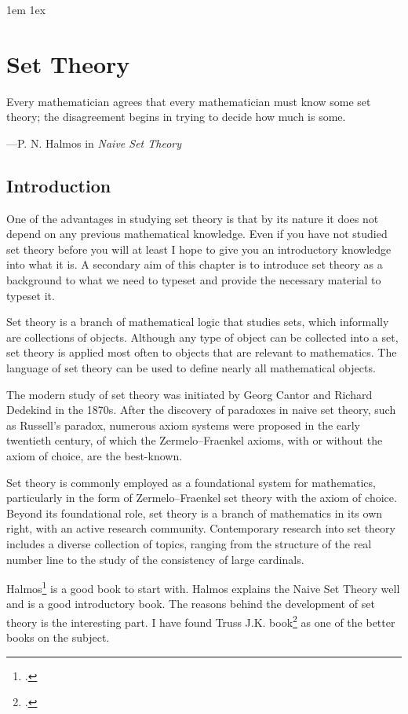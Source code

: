 \large
\parindent1em
\parskip1ex
\chapter{Set Theory}
\epigraph{Every mathematician agrees that every mathematician must know some 
set theory; the disagreement begins in trying to decide how much is some. }{---P. N. Halmos in \textit{Naive Set Theory}}

\section{Introduction}

One of the advantages in studying set theory is that by its nature it does not depend on any previous mathematical knowledge. Even if you have not studied set theory before you will at least I hope to give you an introductory knowledge into what it is. A secondary  aim of this chapter is to introduce set theory as a background to what we need to typeset and provide the necessary material to typeset it.

Set theory is a branch of mathematical logic that studies sets, which informally are collections of objects. Although any type of object can be collected into a set, set theory is applied most often to objects that are relevant to mathematics. The language of set theory can be used to define nearly all mathematical objects.

The modern study of set theory was initiated by Georg Cantor and Richard Dedekind in the 1870s. After the discovery of paradoxes in naive set theory, such as Russell's paradox, numerous axiom systems were proposed in the early twentieth century, of which the Zermelo–Fraenkel axioms, with or without the axiom of choice, are the best-known.

Set theory is commonly employed as a foundational system for mathematics, particularly in the form of Zermelo–Fraenkel set theory with the axiom of choice. Beyond its foundational role, set theory is a branch of mathematics in its own right, with an active research community. Contemporary research into set theory includes a diverse collection of topics, ranging from the structure of the real number line to the study of the consistency of large cardinals.

Halmos\footcite{halmos1960} is a good book to start with. Halmos explains the Naive Set Theory well and is a good introductory book.
The reasons behind the development of set theory is the interesting part. I have found Truss J.K. book\footcite{truss1997} as one of the better books on the subject.

